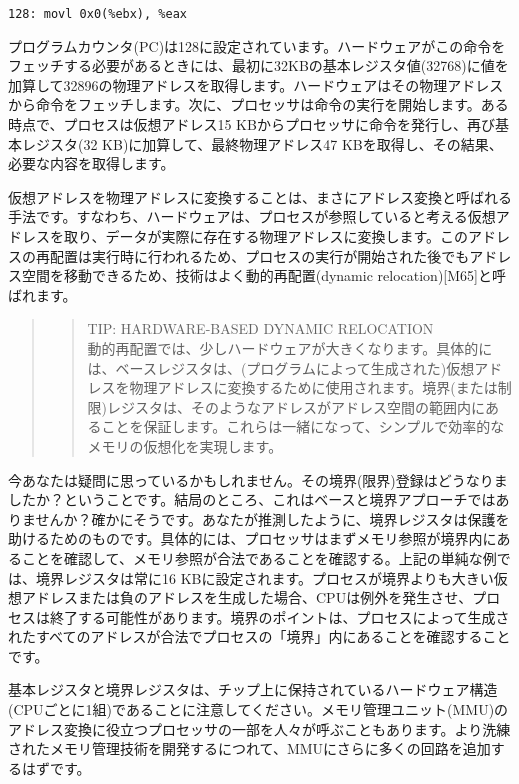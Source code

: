 \begin{verbatim}
128: movl 0x0(%ebx), %eax
\end{verbatim}

プログラムカウンタ(PC)は128に設定されています。ハードウェアがこの命令をフェッチする必要があるときには、最初に32KBの基本レジスタ値(32768)に値を加算して32896の物理アドレスを取得します。ハードウェアはその物理アドレスから命令をフェッチします。次に、プロセッサは命令の実行を開始します。ある時点で、プロセスは仮想アドレス15
K\hspace{0pt}\hspace{0pt}Bからプロセッサに命令を発行し、再び基本レジスタ(32
KB)に加算して、最終物理アドレス47
KBを取得し、その結果、必要な内容を取得します。

仮想アドレスを物理アドレスに変換することは、まさにアドレス変換と呼ばれる手法です。すなわち、ハードウェアは、プロセスが参照していると考える仮想アドレスを取り、データが実際に存在する物理アドレスに変換します。このアドレスの再配置は実行時に行われるため、プロセスの実行が開始された後でもアドレス空間を移動できるため、技術はよく動的再配置(dynamic
relocation){[}M65{]}と呼ばれます。

\begin{quote}
\begin{quote}
TIP: HARDWARE-BASED DYNAMIC RELOCATION\\
動的再配置では、少しハードウェアが大きくなります。具体的には、ベースレジスタは、(プログラムによって生成された)仮想アドレスを物理アドレスに変換するために使用されます。境界(または制限)レジスタは、そのようなアドレスがアドレス空間の範囲内にあることを保証します。これらは一緒になって、シンプルで効率的なメモリの仮想化を実現します。
\end{quote}
\end{quote}

今あなたは疑問に思っているかもしれません。その境界(限界)登録はどうなりましたか？ということです。結局のところ、これはベースと境界アプローチではありませんか？確かにそうです。あなたが推測したように、境界レジスタは保護を助けるためのものです。具体的には、プロセッサはまずメモリ参照が境界内にあることを確認して、メモリ参照が合法であることを確認する。上記の単純な例では、境界レジスタは常に16
KBに設定されます。プロセスが境界よりも大きい仮想アドレスまたは負のアドレスを生成した場合、CPUは例外を発生させ、プロセスは終了する可能性があります。境界のポイントは、プロセスによって生成されたすべてのアドレスが合法でプロセスの「境界」内にあることを確認することです。

基本レジスタと境界レジスタは、チップ上に保持されているハードウェア構造(CPUごとに1組)であることに注意してください。メモリ管理ユニット(MMU)のアドレス変換に役立つプロセッサの一部を人々が呼ぶこともあります。より洗練されたメモリ管理技術を開発するにつれて、MMUにさらに多くの回路を追加するはずです。

